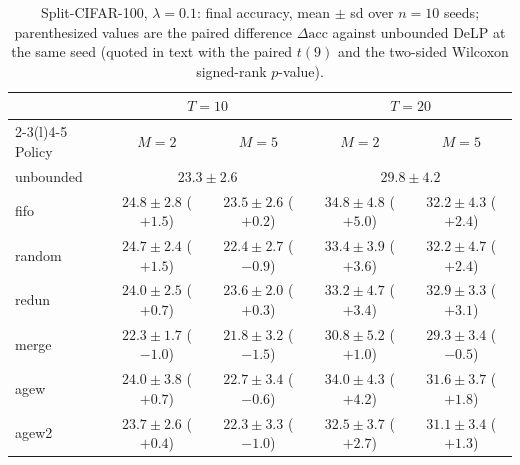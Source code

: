 \documentclass[review,12pt,number]{elsarticle}
\newcommand{\delp}{DeLP}
\newcommand{\acc}{\mathrm{acc}}
\begin{document}
\begin{table}[t]
\centering\small
\caption{Split-CIFAR-100, $\lambda{=}0.1$: final accuracy, mean
$\pm$ sd over $n{=}10$ seeds; parenthesized values are the paired
difference $\Delta\acc$ against unbounded \delp{} at the same seed
(quoted in text with the paired $t(9)$ and the two-sided Wilcoxon
signed-rank $p$-value).}
\label{tab:cifar}
\setlength{\tabcolsep}{4pt}
\footnotesize
\begin{tabular}{lcccc}
\toprule
& \multicolumn{2}{c}{$T{=}10$} & \multicolumn{2}{c}{$T{=}20$} \\
\cmidrule(r){2-3}\cmidrule(l){4-5}
Policy & $M{=}2$ & $M{=}5$ & $M{=}2$ & $M{=}5$ \\
\midrule
unbounded & \multicolumn{2}{c}{$23.3\pm2.6$} & \multicolumn{2}{c}{$29.8\pm4.2$} \\
fifo   & $24.8\pm2.8$ ($+1.5$) & $23.5\pm2.6$ ($+0.2$) &
         $\mathbf{34.8\pm4.8}$ ($+5.0$) & $32.2\pm4.3$ ($+2.4$) \\
random & $24.7\pm2.4$ ($+1.5$) & $22.4\pm2.7$ ($-0.9$) &
         $33.4\pm3.9$ ($+3.6$) & $32.2\pm4.7$ ($+2.4$) \\
redun  & $24.0\pm2.5$ ($+0.7$) & $23.6\pm2.0$ ($+0.3$) &
         $33.2\pm4.7$ ($+3.4$) & $32.9\pm3.3$ ($+3.1$) \\
merge  & $22.3\pm1.7$ ($-1.0$) & $21.8\pm3.2$ ($-1.5$) &
         $30.8\pm5.2$ ($+1.0$) & $29.3\pm3.4$ ($-0.5$) \\
agew   & $24.0\pm3.8$ ($+0.7$) & $22.7\pm3.4$ ($-0.6$) &
         $34.0\pm4.3$ ($+4.2$) & $31.6\pm3.7$ ($+1.8$) \\
agew2  & $23.7\pm2.6$ ($+0.4$) & $22.3\pm3.3$ ($-1.0$) &
         $32.5\pm3.7$ ($+2.7$) & $31.1\pm3.4$ ($+1.3$) \\
\bottomrule
\end{tabular}
\end{table}
\end{document}
